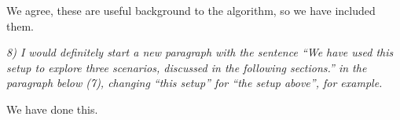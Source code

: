 \documentclass[a4paper,10pt]{article}
\begin{document}
   We agree, these are useful background to the algorithm, so we have included them.
  
{\it    8) I would definitely start a new paragraph with the sentence ``We have
   used this setup to explore three scenarios, discussed in the following
   sections.'' in the paragraph below (7), changing ``this setup'' for ``the
   setup above'', for example.}
  
   We have done this.
  
 
\end{document}
